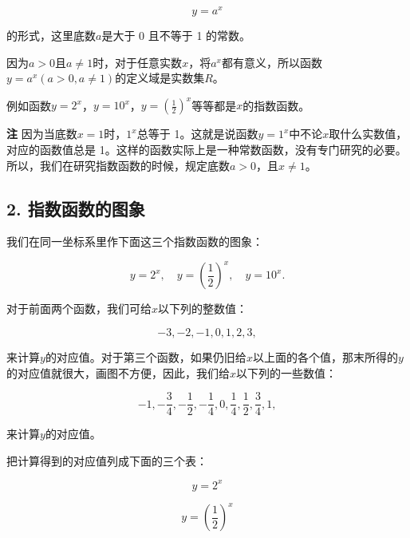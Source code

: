\[
y = a^{x}
\]

的形式，这里底数\(a\)是大于 0 且不等于 1 的常数。

因为\(a > 0\)且\(a \neq 1\)时，对于任意实数\(x\)，将\(a^x\)都有意义，所以函数\(y = a^x (a > 0, a \neq 1)\)的定义域是实数集\(R\)。

例如函数\(y = 2^x\)，\(y = 10^x\)，\(y = \left(\frac{1}{2}\right)^x\)等等都是\(x\)的指数函数。

\textbf{注} 因为当底数\(x = 1\)时，\(1^x\)总等于
1。这就是说函数\(y = 1^x\)中不论\(x\)取什么实数值，对应的函数值总是
1。这样的函数实际上是一种常数函数，没有专门研究的必要。所以，我们在研究指数函数的时候，规定底数\(a > 0\)，且\(x \neq 1\)。

\subsection{2. 指数函数的图象}

我们在同一坐标系里作下面这三个指数函数的图象：

\[
y = 2^{x}, \quad y = \left(\frac{1}{2}\right)^{x}, \quad y = 10^{x}.
\]

对于前面两个函数，我们可给\(x\)以下列的整数值：

\[
- 3, - 2, - 1, 0, 1, 2, 3,
\]

来计算\(y\)的对应值。对于第三个函数，如果仍旧给\(x\)以上面的各个值，那末所得的\(y\)的对应值就很大，画图不方便，因此，我们给\(x\)以下列的一些数值：

\[
- 1, - \frac{3}{4}, - \frac{1}{2}, - \frac{1}{4}, 0, \frac{1}{4}, \frac{1}{2}, \frac{3}{4}, 1,
\]

来计算\(y\)的对应值。

把计算得到的对应值列成下面的三个表：

\[
y = 2^{x}
\]

{\centering
\footnotesize\setlength{\tabcolsep}{2.6pt}%
\par
}

\[
y = \left(\frac{1}{2}\right)^{x}
\]

{\centering
\footnotesize\setlength{\tabcolsep}{2.6pt}%
\par
}

